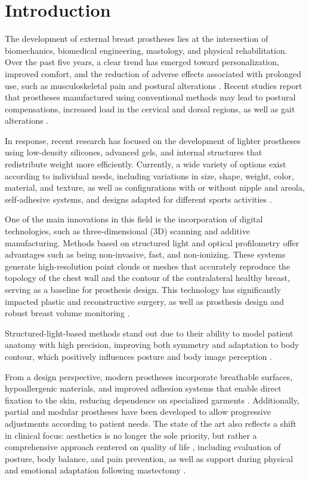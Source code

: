 \documentclass{article}
\begin{document}
	\section{Introduction}

The development of external breast prostheses lies at the intersection of biomechanics, biomedical engineering, mastology, and physical rehabilitation. Over the past five years, a clear trend has emerged toward personalization, improved comfort, and the reduction of adverse effects associated with prolonged use, such as musculoskeletal pain and postural alterations \cite{ACS2023,Surmeli2025}. Recent studies report that prostheses manufactured using conventional methods may lead to postural compensations, increased load in the cervical and dorsal regions, as well as gait alterations \cite{Koralewska2022}. 

In response, recent research has focused on the development of lighter prostheses using low-density silicones, advanced gels, and internal structures that redistribute weight more efficiently. Currently, a wide variety of options exist according to individual needs, including variations in size, shape, weight, color, material, and texture, as well as configurations with or without nipple and areola, self-adhesive systems, and designs adapted for different sports activities \cite{Crompvoets2012,Fitch2012,Livingston2005}.

One of the main innovations in this field is the incorporation of digital technologies, such as three-dimensional (3D) scanning and additive manufacturing. Methods based on structured light and optical profilometry offer advantages such as being non-invasive, fast, and non-ionizing. These systems generate high-resolution point clouds or meshes that accurately reproduce the topology of the chest wall and the contour of the contralateral healthy breast, serving as a baseline for prosthesis design. This technology has significantly impacted plastic and reconstructive surgery, as well as prosthesis design and robust breast volume monitoring \cite{Kastrup2024,Dijkman2024}. 

Structured-light-based methods stand out due to their ability to model patient anatomy with high precision, improving both symmetry and adaptation to body contour, which positively influences posture and body image perception \cite{Eggbeer2011,Paxton2022}.

From a design perspective, modern prostheses incorporate breathable surfaces, hypoallergenic materials, and improved adhesion systems that enable direct fixation to the skin, reducing dependence on specialized garments \cite{WHO2021}. Additionally, partial and modular prostheses have been developed to allow progressive adjustments according to patient needs. The state of the art also reflects a shift in clinical focus: aesthetics is no longer the sole priority, but rather a comprehensive approach centered on quality of life \cite{Casanovas}, including evaluation of posture, body balance, and pain prevention, as well as support during physical and emotional adaptation following mastectomy \cite{Aakin2026,Hojan2016}. 
\end{document}
